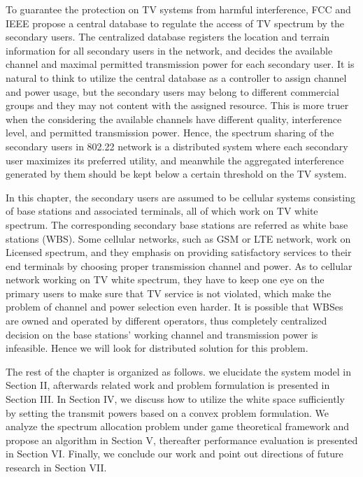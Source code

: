 To guarantee the protection on TV systems from harmful interference, FCC and IEEE propose a central database to regulate the access of TV spectrum by the secondary users.
The centralized database registers the location and terrain information for all secondary users in the network, and decides the available channel and maximal permitted transmission power for each secondary user. 
It is natural to think to utilize the central database as a controller to assign channel and power usage, but the secondary users may belong to different commercial groups and they may not content with the assigned resource.
This is more truer when the considering the available channels have different quality, \ie interference level, and permitted transmission power.
Hence, the spectrum sharing of the secondary users in 802.22 network is a distributed system where each secondary user maximizes its preferred utility, and meanwhile the aggregated interference generated by them should be kept below a certain threshold on the TV system.

In this chapter, the secondary users are assumed to be cellular systems consisting of base stations and associated terminals, all of which work on TV white spectrum. The corresponding secondary base stations are referred as white base stations (WBS). Some cellular networks, such as GSM or LTE network, work on Licensed spectrum, and they emphasis on providing satisfactory services to their end terminals by choosing proper transmission channel and power. As to cellular network working on TV white spectrum, they have to keep one eye on the primary users to make sure that TV service is not violated, which make the problem of channel and power selection even harder. It is possible that WBSes are owned and operated by different operators, thus completely centralized decision on the base stations' working channel and transmission power is infeasible. Hence we will look for distributed solution for this problem.

The rest of the chapter is organized as follows. we elucidate the system model in Section II, afterwards related work and problem formulation is presented in Section III. In Section IV, we discuss how to utilize the white space sufficiently by setting the transmit powers based on a convex problem formulation. We analyze the spectrum allocation problem under game theoretical framework and propose an algorithm in Section V, thereafter performance evaluation is presented in Section VI. Finally, we conclude our work and point out directions of future research in Section VII.


